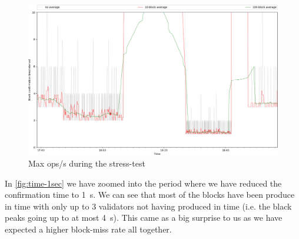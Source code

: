 \begin{figure}[!htp]
 \centering
 \includegraphics[width=\linewidth]{figures/stress-test-block-time-1sec.png}
 \caption{Max ops/s during the stress-test}
 \label{fig:time-1se}
\end{figure}

In \cref{fig:time-1sec} we have zoomed into the period where we have reduced
the confirmation time to \SI{1}{s}. We can see that most of the blocks have
been produce in time with only up to 3 validators not having produced in time
(i.e. the black peaks going up to at most \SI{4}{s}). This came as a big
surprise to us as we have expected a higher block-miss rate all together.
